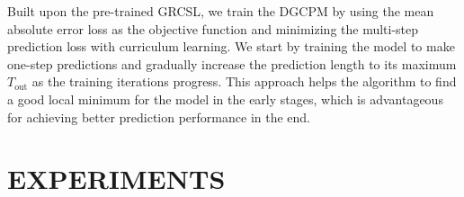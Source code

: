 \documentclass[letterpaper, 10 pt, conference]{ieeeconf}
\begin{document}
Built upon the pre-trained GRCSL, we train the DGCPM by using the mean absolute error loss as the objective function and minimizing the multi-step prediction loss with curriculum learning. We start by training the model to make one-step predictions and gradually increase the prediction length to its maximum $T_\text{out}$ as the training iterations progress. This approach helps the algorithm to find a good local minimum for the model in the early stages, which is advantageous for achieving better prediction performance in the end.

\section{EXPERIMENTS}

\begin{table}[t]
        \centering
        \caption{Traffic Forecasting Performance Comparison for METR-LA}
        \label{tab:baselines}
        \begin{threeparttable} 
\end{threeparttable}
\end{table}
\end{document}
